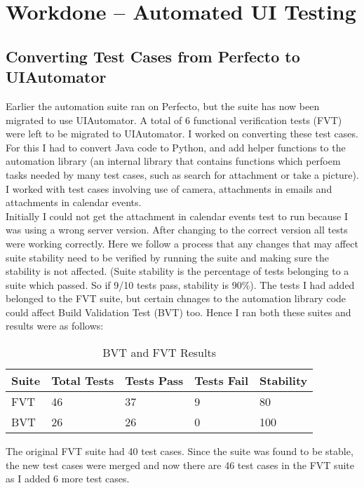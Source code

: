 \setlength\parindent{0pt}

\chapter{Workdone -- Automated UI Testing}

\section{Converting Test Cases from Perfecto to UIAutomator}
Earlier the automation suite ran on Perfecto, but the suite has now been migrated to use UIAutomator. A total of 6 functional verification tests (FVT) were left to be migrated to UIAutomator. I worked on converting these test cases. For this I had to convert Java code to Python, and add helper functions to the automation library (an internal library that contains functions which perfoem tasks needed by many test cases, such as search for attachment or take a picture). I worked with test cases involving use of camera, attachments in emails and attachments in calendar events. \\

Initially I could not get the attachment in calendar events test to run because I was using a wrong server version. After changing to the correct version all tests were working correctly. Here we follow a process that any changes that may affect suite stability need to be verified by running the suite and making sure the stability is not affected. (Suite stability is the percentage of tests belonging to a suite which passed. So if 9/10 tests pass, stability is 90\%). The tests I had added belonged to the FVT suite, but certain chnages to the automation library code could affect Build Validation Test (BVT) too. Hence I ran both these suites and results were as follows:

\begin{table}[!h]
\centering
\caption{BVT and FVT Results}
\begin{tabular}{|l|l|l|l|l|}
\hline
Suite & Total Tests & Tests Pass & Tests Fail & Stability \\ \hline
FVT   & 46          & 37         & 9          & 80        \\ \hline
BVT   & 26          & 26         & 0          & 100       \\ \hline         
\end{tabular}
\end{table} 

The original FVT suite had 40 test cases. Since the suite was found to be stable, the new test cases were merged and now there are 46 test cases in the FVT suite as I added 6 more test cases.

